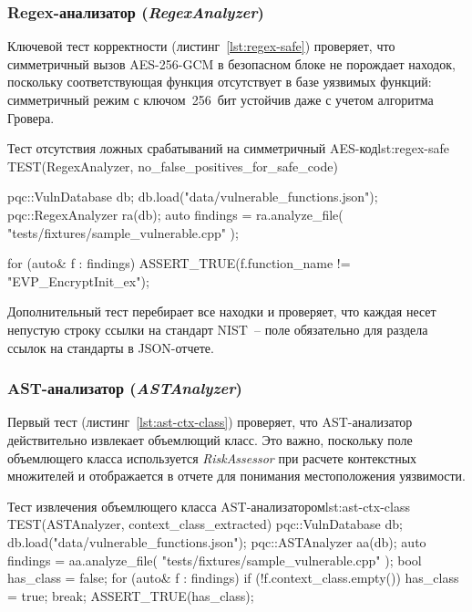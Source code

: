 \documentclass{itmo-vkr}
\newcommand{\code}[1]{\textit{#1}}
\begin{document}
\subsubsection{Regex-анализатор (\code{RegexAnalyzer})}

Ключевой тест корректности (листинг~\ref{lst:regex-safe})
проверяет, что симметричный вызов AES-256-GCM в безопасном блоке
не порождает находок, поскольку соответствующая функция отсутствует
в базе уязвимых функций: симметричный режим с ключом~256~бит
устойчив даже с учетом алгоритма Гровера.

\begin{itmolisting}[C++]{Тест отсутствия ложных срабатываний на симметричный AES-код}{lst:regex-safe}
TEST(RegexAnalyzer, no_false_positives_for_safe_code) {
    pqc::VulnDatabase db;
    db.load("data/vulnerable_functions.json");
    pqc::RegexAnalyzer ra(db);
    auto findings = ra.analyze_file(
        "tests/fixtures/sample_vulnerable.cpp"
    );

    for (auto& f : findings)
        ASSERT_TRUE(f.function_name != "EVP_EncryptInit_ex");
}
\end{itmolisting}

Дополнительный тест перебирает все находки и проверяет, что каждая
несет непустую строку ссылки на стандарт NIST~-- поле обязательно
для раздела ссылок на стандарты в JSON-отчете.

\subsubsection{AST-анализатор (\code{ASTAnalyzer})}

Первый тест (листинг~\ref{lst:ast-ctx-class})
проверяет, что AST-анализатор действительно извлекает объемлющий
класс.
Это важно, поскольку поле объемлющего класса используется
\code{RiskAssessor} при расчете контекстных множителей и
отображается в отчете для понимания местоположения уязвимости.

\begin{itmolisting}[C++]{Тест извлечения объемлющего класса AST-анализатором}{lst:ast-ctx-class}
TEST(ASTAnalyzer, context_class_extracted) {
    pqc::VulnDatabase db;
    db.load("data/vulnerable_functions.json");
    pqc::ASTAnalyzer aa(db);
    auto findings = aa.analyze_file(
        "tests/fixtures/sample_vulnerable.cpp"
    );
    bool has_class = false;
    for (auto& f : findings)
        if (!f.context_class.empty()) { has_class = true; break; }
    ASSERT_TRUE(has_class);
}
\end{itmolisting}
\end{document}
